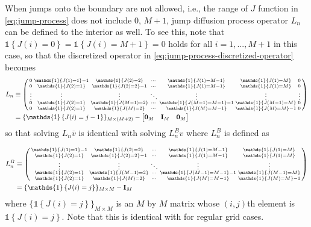 \documentclass[11pt]{article}
\newcommand{\indicator}[1]{\ensuremath{\mathds{1}\left\{{#1}\right\}}}
\newenvironment{psmallmatrix}
{\left(\begin{smallmatrix}}
	{\end{smallmatrix}\right)}
\theoremstyle{definition}
\begin{document}
When jumps onto the boundary are not allowed, i.e., the range of $J$ function in \eqref{eq:jump-process} does not include $0$, $M+1$,  jump diffusion process operator $L_n$ can be defined to the interior as well. To see this, note that $\indicator{J(i) = 0} = \indicator{J(i) = M+1} = 0$ holds for all $i = 1,..., M+1$ in this case, so that the discretized operator in \eqref{eq:jump-process-discretized-operator} becomes
\begin{align}
L_n &\equiv \begin{psmallmatrix}
0 & \indicator{J(1) = 1} -1 & \indicator{J(2) = 2} & \cdots & \indicator{J(1) = M-1} & \indicator{J(1) = M} & 0 \\
0 & \indicator{J(2) = 1}  & \indicator{J(2) = 2} - 1 & \cdots & \indicator{J(1) = M-1}  & \indicator{J(1) = M} & 0 \\
\vdots & \vdots & \vdots & \ddots & \vdots & \vdots &\vdots \\
0 & \indicator{J(2) = 1}  & \indicator{J(M-1) = 2} & \cdots & \indicator{J(M-1) = M-1} - 1 & \indicator{J(M-1) = M} &0 \\
0 & \indicator{J(2) = 1}  & \indicator{J(M) = 2} & \cdots & \indicator{J(M) = M-1}  & \indicator{J(M) = M} - 1&0
\end{psmallmatrix}
\\
&= \{ \indicator{ J(i) = j-1 } \}_{M \times (M+2)} - \begin{bmatrix} \mathbf{0}_M &\mathbf{I}_M & \mathbf{0}_M  \end{bmatrix}
\end{align}
so that solving $L_n \overline{v} $ is identical with solving $L_n^B v$ where $L_n^B$ is defined as

\begin{align}
L_n^B &\equiv \begin{psmallmatrix}
\indicator{J(1) = 1} -1 & \indicator{J(2) = 2} & \cdots & \indicator{J(1) = M-1} & \indicator{J(1) = M}  \\
\indicator{J(2) = 1}  & \indicator{J(2) = 2} - 1 & \cdots & \indicator{J(1) = M-1}  & \indicator{J(1) = M}  \\
\vdots & \vdots & \ddots & \vdots & \vdots \\
\indicator{J(2) = 1}  & \indicator{J(M-1) = 2} & \cdots & \indicator{J(M-1) = M-1} - 1 & \indicator{J(M-1) = M}  \\
\indicator{J(2) = 1}  & \indicator{J(M) = 2} & \cdots & \indicator{J(M) = M-1}  & \indicator{J(M) = M} - 1
\end{psmallmatrix}
\\
&= \{ \indicator{ J(i) = j } \}_{M \times M} - \mathbf{I}_M 
\end{align}
where $\{ \indicator{ J(i) = j } \}_{M \times M} $ is an $M$ by $M$ matrix whose $(i,j)$th element is $ \indicator{ J(i) = j } $. Note that this is identical with \label{eq:jump-process-discretized-operator-interior} for regular grid cases.
\end{document}
